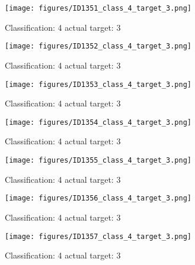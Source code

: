 \begin{figure}[h!]
\begin{center}
\texttt{[image: figures/ID1351\_class\_4\_target\_3.png]}
\end{center}
\caption{ Classification: 4 actual target: 3}
\label{fig:ID1351_class_4_target_3}
\end{figure}
\begin{figure}[h!]
\begin{center}
\texttt{[image: figures/ID1352\_class\_4\_target\_3.png]}
\end{center}
\caption{ Classification: 4 actual target: 3}
\label{fig:ID1352_class_4_target_3}
\end{figure}
\begin{figure}[h!]
\begin{center}
\texttt{[image: figures/ID1353\_class\_4\_target\_3.png]}
\end{center}
\caption{ Classification: 4 actual target: 3}
\label{fig:ID1353_class_4_target_3}
\end{figure}
\begin{figure}[h!]
\begin{center}
\texttt{[image: figures/ID1354\_class\_4\_target\_3.png]}
\end{center}
\caption{ Classification: 4 actual target: 3}
\label{fig:ID1354_class_4_target_3}
\end{figure}
\begin{figure}[h!]
\begin{center}
\texttt{[image: figures/ID1355\_class\_4\_target\_3.png]}
\end{center}
\caption{ Classification: 4 actual target: 3}
\label{fig:ID1355_class_4_target_3}
\end{figure}
\begin{figure}[h!]
\begin{center}
\texttt{[image: figures/ID1356\_class\_4\_target\_3.png]}
\end{center}
\caption{ Classification: 4 actual target: 3}
\label{fig:ID1356_class_4_target_3}
\end{figure}
\begin{figure}[h!]
\begin{center}
\texttt{[image: figures/ID1357\_class\_4\_target\_3.png]}
\end{center}
\caption{ Classification: 4 actual target: 3}
\label{fig:ID1357_class_4_target_3}
\end{figure}
